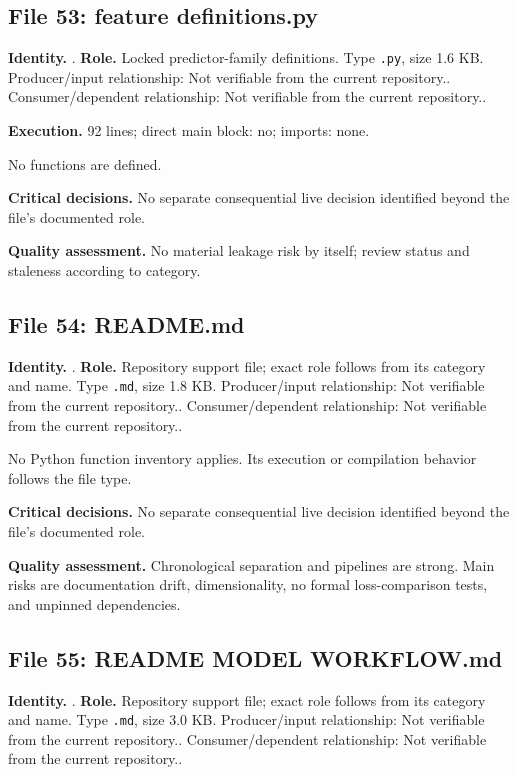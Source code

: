 \documentclass[
  11pt,
  a4paper]{article}
\newcounter{none} %
\begin{document}
\subsection{File 53: feature
definitions.py}\label{file-9213648641189305996}

\textbf{Identity.} . \textbf{Role.}
Locked predictor-family definitions. Type \texttt{.py}, size 1.6 KB.
Producer/input relationship: Not verifiable from the current
repository.. Consumer/dependent relationship: Not verifiable from the
current repository..

\textbf{Execution.} 92 lines; direct main block: no; imports: none.

No functions are defined.

\textbf{Critical decisions.} No separate consequential live decision
identified beyond the file's documented role.

\textbf{Quality assessment.} No material leakage risk by itself; review
status and staleness according to category.

\subsection{File 54: README.md}\label{file-4129277366252988615}

\textbf{Identity.} . \textbf{Role.}
Repository support file; exact role follows from its category and name.
Type \texttt{.md}, size 1.8 KB. Producer/input relationship: Not
verifiable from the current repository.. Consumer/dependent
relationship: Not verifiable from the current repository..

No Python function inventory applies. Its execution or compilation
behavior follows the file type.

\textbf{Critical decisions.} No separate consequential live decision
identified beyond the file's documented role.

\textbf{Quality assessment.} Chronological separation and pipelines are
strong. Main risks are documentation drift, dimensionality, no formal
loss-comparison tests, and unpinned dependencies.

\subsection{File 55: README MODEL
WORKFLOW.md}\label{file-9016312377372354218}

\textbf{Identity.} .
\textbf{Role.} Repository support file; exact role follows from its
category and name. Type \texttt{.md}, size 3.0 KB. Producer/input
relationship: Not verifiable from the current repository..
Consumer/dependent relationship: Not verifiable from the current
repository..
\end{document}
